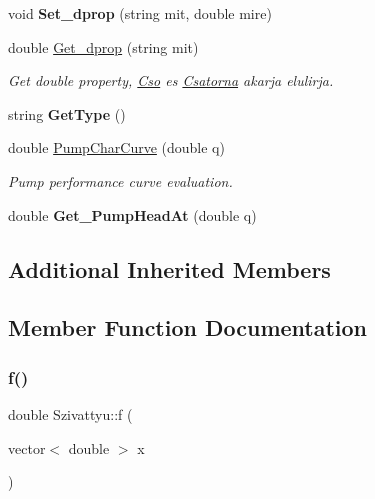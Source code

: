 \begin{DoxyCompactItemize}
void {\bfseries Set\+\_\+dprop} (string mit, double mire)
\item 
\mbox{\label{class_szivattyu_a265478146336e8c8db8fe2b9ecdf6678}} 
double \hyperlink{class_szivattyu_a265478146336e8c8db8fe2b9ecdf6678}{Get\+\_\+dprop} (string mit)
\begin{DoxyCompactList}\small\item\em Get double property, \hyperlink{class_cso}{Cso} es \hyperlink{class_csatorna}{Csatorna} akarja elulirja. \end{DoxyCompactList}\item 
\mbox{\label{class_szivattyu_a373372511e4b9ad88474594052c69a6a}} 
string {\bfseries Get\+Type} ()
\item 
double \hyperlink{class_szivattyu_ad2fec54e4e5cb236bc7b6a3e8dfbed2f}{Pump\+Char\+Curve} (double q)
\begin{DoxyCompactList}\small\item\em Pump performance curve evaluation. \end{DoxyCompactList}\item 
\mbox{\label{class_szivattyu_ad2ddc46a360f9a4de20cae65dd381240}} 
double {\bfseries Get\+\_\+\+Pump\+Head\+At} (double q)
\end{DoxyCompactItemize}
\subsection*{Additional Inherited Members}


\subsection{Member Function Documentation}
\mbox{\label{class_szivattyu_a083379e0cee2db17f1b20db3fdfcde79}} 
\subsubsection{\texorpdfstring{f()}{f()}}
{\footnotesize\ttfamily double Szivattyu\+::f (\begin{DoxyParamCaption}\item[{vector$<$ double $>$}]{x }\end{DoxyParamCaption})\hspace{0.3cm}{\ttfamily [virtual]}}




